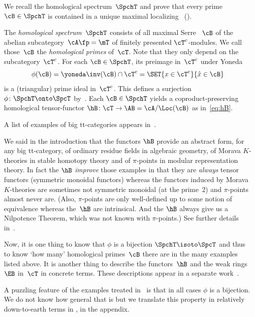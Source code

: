We recall the homological spectrum~$\SpchT$ and prove that every prime $\cB\in\SpchT$ is contained in a unique maximal localizing \tensid\ ().

\begin{Rec}
\label{Rec:Spch}
The \emph{homological spectrum}~$\SpchT$ consists of all maximal Serre \tensids\ $\cB$ of the abelian subcategory~$\cA\fp=\mT$ of finitely presented $\cT^c$\nobreakdash-modules. We call those~$\cB$ the \emph{homological primes} of~$\cT$. Note that they only depend on the subcategory~$\cT^c$. For each $\cB\in\SpchT$, its preimage in~$\cT^c$ under Yoneda
\[
\phi(\cB)=\yoneda\inv(\cB)\cap \cT^c=\SET{x\in\cT^c}{\hat x\in\cB}
\]
is a (triangular) prime ideal in~$\cT^c$. This defines a surjection~$\phi\colon\SpchT\onto \SpcT$ by~\cite[Cor.\,3.9]{Balmer20a}. Each $\cB\in\SpchT$ yields a coproduct-preserving homological tensor-functor $\hB\colon \cT\to \AB=\cA/\Loc(\cB)$ as in~\eqref{eq:hB}.
\end{Rec}

\begin{Exas}
A list of examples of big tt-categories appears in~\cite[\S1.2]{HoveyPalmieriStrickland97}.

We said in the introduction that the functors $\hB$ provide an abstract form, for any big tt-category, of ordinary residue fields in algebraic geometry, of Morava $K$\nobreakdash-theories in stable homotopy theory and of $\pi$-points in modular representation theory. In fact the $\hB$ \emph{improve} those examples in that they are \emph{always} tensor functors (\ie symmetric monoidal functors) whereas the functors induced by Morava $K$-theories are sometimes not symmetric monoidal (at the prime~2) and $\pi$-points almost never are. (Also, $\pi$\nobreakdash-points are only well-defined up to some notion of equivalence whereas the~$\hB$ are intrinsical. And the $\hB$ always give us a Nilpotence Theorem, which was not known with $\pi$-points.) See further details in~\cite[\S5]{Balmer20a}.

Now, it is one thing to know that $\phi$ is a bijection $\SpchT\isoto \SpcT$ and thus to know `how many' homological primes~$\cB$ there are in the many examples listed above. It is another thing to describe the functors~$\hB$ and the weak rings~$\EB$ in~$\cT$ in concrete terms. These descriptions appear in a separate work~\cite{BalmerCameron20pp}.
\end{Exas}

\begin{Rem}
A puzzling feature of the examples treated in~\cite{Balmer20a} is that in all cases $\phi$ is a bijection. We do not know how general that is but we translate this property in relatively down-to-earth terms in , in the appendix.
\end{Rem}

